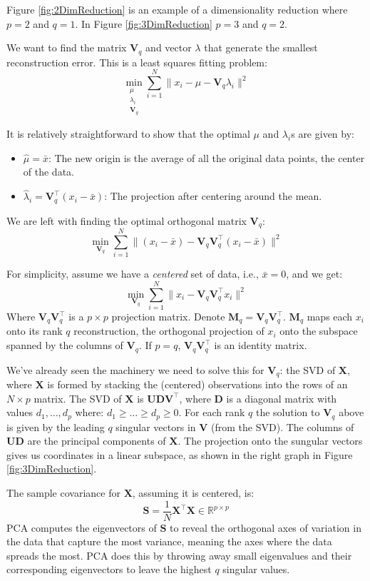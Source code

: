 \documentclass[a4paper]{article}
\begin{document}
Figure \ref{fig:2DimReduction} is an example of a dimensionality reduction where $p=2$ and $q=1$. In Figure \ref{fig:3DimReduction} $p=3$ and $q=2$. 

We want to find the matrix $\mathbf{V}_q$ and vector $\lambda$ that generate the smallest reconstruction error. This is a least squares fitting problem:
$$\min_{\substack{
   \mu \\
   {\lambda_i} \\
   \mathbf{V}_q
  }} \sum_{i=1}^N \| x_i-\mu-\mathbf{V}_q\lambda_i \|^2$$
  
It is relatively straightforward to show that the optimal $\mu$ and $\lambda_i$s are given by:
\begin{itemize}
\item $\hat{\mu}=\bar{x}$: The new origin is the average of all the original data points, the center of the data.
\item $\hat{\lambda}_i=\mathbf{V}_q^\top(x_i-\bar{x})$: The projection after centering around the mean.
\end{itemize}

We are left with finding the optimal orthogonal matrix $\mathbf{V}_q$:
$$\min_{\mathbf{V}_q} \sum_{i=1}^N \| (x_i-\bar{x})-\mathbf{V}_q\mathbf{V}_q^\top(x_i-\bar{x})\|^2$$

For simplicity, assume we have a \textit{centered} set of data, i.e., $\bar{x}=0$, and we get:
$$\min_{\mathbf{V}_q} \sum_{i=1}^N \| x_i -\mathbf{V}_q\mathbf{V}_q^\top x_i \|^2$$
Where $\mathbf{V}_q\mathbf{V}_q^\top$ is a $p\times p$ projection matrix. Denote $\mathbf{M}_q=\mathbf{V}_q\mathbf{V}_q^\top$. $\mathbf{M}_q$ maps each $x_i$ onto its rank $q$ reconstruction, the orthogonal projection of $x_i$ onto the subspace spanned by the columns of $\mathbf{V}_q$. If $ p = q $, $\mathbf{V}_q\mathbf{V}_q^\top$  is an identity matrix.

We've already seen the machinery we need to solve this for $\mathbf{V}_q$: the SVD of $\mathbf{X}$, where $\mathbf{X}$ is formed by stacking the (centered) observations into the rows of an $N\times p$ matrix. The SVD of $\mathbf{X}$ is $\mathbf{U}\mathbf{D}\mathbf{V}^\top$, where $\mathbf{D}$ is a diagonal matrix with values $d_1, \ldots, d_p$ where: $d_1 \geq \ldots \geq d_p \geq 0$.
For each rank $q$ the solution to $\mathbf{V}_q$ above is given by the leading $q$ singular vectors in $\mathbf{V}$ (from the SVD). The columns of $\mathbf{UD}$ are the principal components of $\mathbf{X}$. The projection onto the sungular vectors gives us coordinates in a linear subspace, as shown in the right graph in Figure \ref{fig:3DimReduction}.

The sample covariance for $\mathbf{X}$, assuming it is centered, is:
$$\mathbf{S}=\frac{1}{N}\mathbf{X}^\top\mathbf{X}\in\mathbb{R}^{p\times p}$$
PCA computes the eigenvectors of $\mathbf{S}$ to reveal the orthogonal axes of variation in the data that capture the most variance, meaning the axes where the data spreads the most. PCA does this by throwing away small eigenvalues and their corresponding eigenvectors to leave the highest $q$ singular values.
\end{document}

